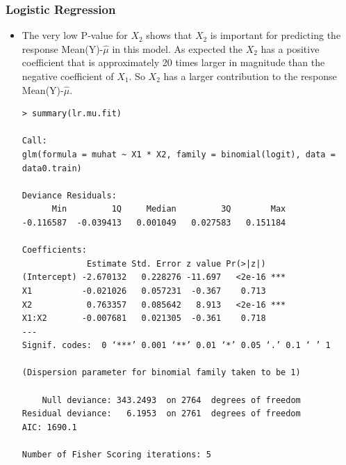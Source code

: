 \documentclass[twoside,12pt]{article}
\begin{document}
\subsubsection{Logistic Regression}
\begin{itemize}
\item
The very low P-value for $X_2$ shows that $X_2$ is important for predicting the response Mean(Y)-$\hat{\mu}$ in this model. As expected the $X_2$ has a positive coefficient that is approximately 20 times larger in magnitude than the  negative coefficient of $X_1$. So $X_2$ has a larger contribution to the response Mean(Y)-$\hat{\mu}$.
\begin{verbatim}
> summary(lr.mu.fit)

Call:
glm(formula = muhat ~ X1 * X2, family = binomial(logit), data = data0.train)

Deviance Residuals: 
      Min         1Q     Median         3Q        Max  
-0.116587  -0.039413   0.001049   0.027583   0.151184  

Coefficients:
             Estimate Std. Error z value Pr(>|z|)    
(Intercept) -2.670132   0.228276 -11.697   <2e-16 ***
X1          -0.021026   0.057231  -0.367    0.713    
X2           0.763357   0.085642   8.913   <2e-16 ***
X1:X2       -0.007681   0.021305  -0.361    0.718    
---
Signif. codes:  0 ‘***’ 0.001 ‘**’ 0.01 ‘*’ 0.05 ‘.’ 0.1 ‘ ’ 1

(Dispersion parameter for binomial family taken to be 1)

    Null deviance: 343.2493  on 2764  degrees of freedom
Residual deviance:   6.1953  on 2761  degrees of freedom
AIC: 1690.1

Number of Fisher Scoring iterations: 5

\end{verbatim}


\end{itemize}
\end{document}
